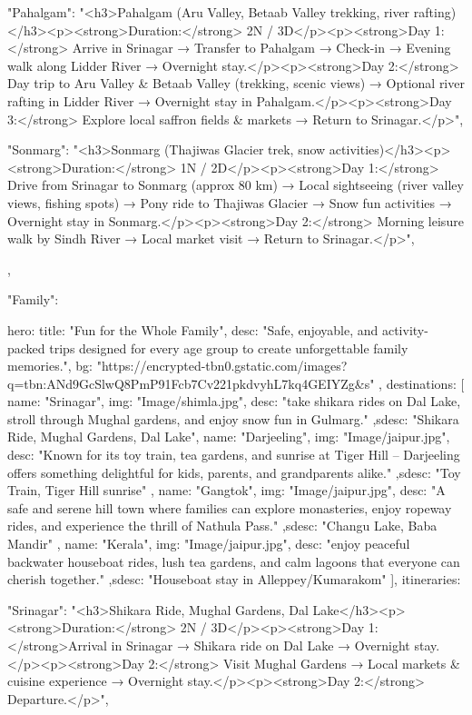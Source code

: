 {{{      "Pahalgam": "<h3>Pahalgam (Aru Valley, Betaab Valley trekking, river rafting)</h3><p><strong>Duration:</strong> 2N / 3D</p><p><strong>Day 1:</strong> Arrive in Srinagar → Transfer to Pahalgam → Check-in → Evening walk along Lidder River → Overnight stay.</p><p><strong>Day 2:</strong> Day trip to Aru Valley & Betaab Valley (trekking, scenic views) → Optional river rafting in Lidder River → Overnight stay in Pahalgam.</p><p><strong>Day 3:</strong> Explore local saffron fields & markets → Return to Srinagar.</p>",

      "Sonmarg": "<h3>Sonmarg (Thajiwas Glacier trek, snow activities)</h3><p><strong>Duration:</strong> 1N / 2D</p><p><strong>Day 1:</strong> Drive from Srinagar to Sonmarg (approx 80 km) → Local sightseeing (river valley views, fishing spots) → Pony ride to Thajiwas Glacier → Snow fun activities → Overnight stay in Sonmarg.</p><p><strong>Day 2:</strong> Morning leisure walk by Sindh River → Local market visit → Return to Srinagar.</p>",

    }
  },

  "Family": {
    hero: {
      title: "Fun for the Whole Family",
      desc: "Safe, enjoyable, and activity-packed trips designed for every age group to create unforgettable family memories.",
      bg: "https://encrypted-tbn0.gstatic.com/images?q=tbn:ANd9GcSlwQ8PmP91Fcb7Cv221pkdvyhL7kq4GEIYZg&s"
    },
    destinations: [
      { name: "Srinagar", img: "Image/shimla.jpg", desc: "take shikara rides on Dal Lake, stroll through Mughal gardens, and enjoy snow fun in Gulmarg." ,sdesc: "Shikara Ride, Mughal Gardens, Dal Lake"},
      { name: "Darjeeling", img: "Image/jaipur.jpg", desc: "Known for its toy train, tea gardens, and sunrise at Tiger Hill – Darjeeling offers something delightful for kids, parents, and grandparents alike." ,sdesc: "Toy Train, Tiger Hill sunrise" },
      { name: "Gangtok", img: "Image/jaipur.jpg", desc: "A safe and serene hill town where families can explore monasteries, enjoy ropeway rides, and experience the thrill of Nathula Pass." ,sdesc: "Changu Lake, Baba Mandir" },
      { name: "Kerala", img: "Image/jaipur.jpg", desc: "enjoy peaceful backwater houseboat rides, lush tea gardens, and calm lagoons that everyone can cherish together." ,sdesc: "Houseboat stay in Alleppey/Kumarakom" }
    ],
    itineraries: {
      "Srinagar": "<h3>Shikara Ride, Mughal Gardens, Dal Lake</h3><p><strong>Duration:</strong> 2N / 3D</p><p><strong>Day 1:</strong>Arrival in Srinagar → Shikara ride on Dal Lake → Overnight stay.</p><p><strong>Day 2:</strong> Visit Mughal Gardens → Local markets & cuisine experience → Overnight stay.</p><p><strong>Day 2:</strong> Departure.</p>",

}}}
